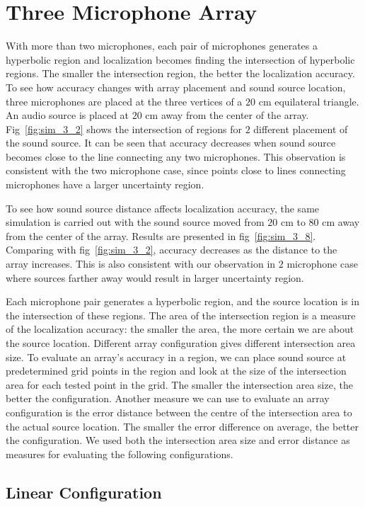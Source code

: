 \section{Three Microphone Array}
With more than two microphones, each pair of microphones generates a hyperbolic region and localization becomes finding the intersection of hyperbolic regions. The smaller the intersection region, the better the localization accuracy. To see how accuracy changes with array placement and sound source location, three microphones are placed at the three vertices of a $20$ cm equilateral triangle. An audio source is placed at $20$ cm away from the center of the array. Fig~\ref{fig:sim_3_2} shows the intersection of regions for $2$ different placement of the sound source. It can be seen that accuracy decreases when sound source becomes close to the line connecting any two microphones. This observation is consistent with the two microphone case, since points close to lines connecting microphones have a larger uncertainty region.

To see how sound source distance affects localization accuracy, the same simulation is carried out with the sound source moved from $20$ cm to $80$ cm away from the center of the array. Results are presented in fig~\ref{fig:sim_3_8}. Comparing with fig~\ref{fig:sim_3_2}, accuracy decreases as the distance to the array increases. This is also consistent with our observation in $2$ microphone case where sources farther away would result in larger uncertainty region.

Each microphone pair generates a hyperbolic region, and the source location is in the intersection of these regions. The area of the intersection region is a measure of the localization accuracy: the smaller the area, the more certain we are about the source location. Different array configuration gives different intersection area size. To evaluate an array's accuracy in a region, we can place sound source at predetermined grid points in the region and look at the size of the intersection area for each tested point in the grid. The smaller the intersection area size, the better the configuration. Another measure we can use to evaluate an array configuration is the error distance between the centre of the intersection area to the actual source location. The smaller the error difference on average, the better the configuration. We used both the intersection area size and error distance as measures for evaluating the following configurations.
 
\subsection{Linear Configuration}

